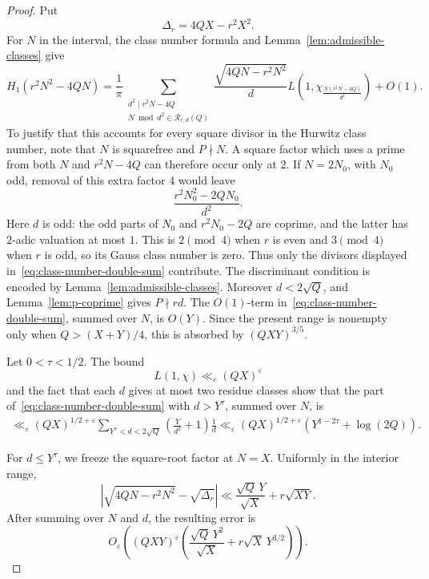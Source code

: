 \documentclass[10pt,a4paper]{amsart}
\begin{document}
\begin{proof}
Put
\[
\Delta_r=4QX-r^2X^2.
\]
For $N$ in the interval, the class number formula and
Lemma~\ref{lem:admissible-classes} give
\begin{equation}\label{eq:class-number-double-sum}
H_1(r^2N^2-4QN)
=
\frac1\pi
\sum_{\substack{d^2\mid r^2N-4Q\\
N\bmod d^2\in\mathcal R_{r,d}(Q)}}
\frac{\sqrt{4QN-r^2N^2}}{d}
L\left(1,\chi_{\frac{N(r^2N-4Q)}{d^2}}\right)
+
O(1).
\end{equation}
To justify that this accounts for every square divisor in the Hurwitz class number, note that $N$ is squarefree and $P\nmid N$.
A square factor which uses a prime from both $N$ and $r^2N-4Q$ can therefore occur only at $2$.
If $N=2N_0$, with $N_0$ odd, removal of this extra factor $4$ would leave
\[
\frac{r^2N_0^2-2QN_0}{d^2}.
\]
Here $d$ is odd: the odd parts of $N_0$ and
$r^2N_0-2Q$ are coprime, and the latter has $2$-adic valuation at most $1$.
This is $2\pmod4$ when $r$ is even and $3\pmod4$ when $r$ is odd, so its Gauss class number is zero.
Thus only the divisors displayed in~\eqref{eq:class-number-double-sum} contribute.
The discriminant condition is encoded by Lemma~\ref{lem:admissible-classes}.
Moreover $d<2\sqrt Q$, and Lemma~\ref{lem:p-coprime} gives $P\nmid rd$.
The $O(1)$-term in~\eqref{eq:class-number-double-sum}, summed over $N$, is $O(Y)$.
Since the present range is nonempty only when $Q>(X+Y)/4$, this is absorbed by $(QXY)^{3/5}$.

Let $0<\tau<1/2$.
The bound
\[
L(1,\chi)\ll_\varepsilon(QX)^\varepsilon
\]
and the fact that each $d$ gives at most two residue classes show that the part of~\eqref{eq:class-number-double-sum} with $d>Y^\tau$, summed over $N$, is
\begin{align}
\ll_\varepsilon
(QX)^{1/2+\varepsilon}
\sum_{Y^\tau<d<2\sqrt Q}
\left(\frac{Y}{d^2}+1\right)\frac1d
\ll_\varepsilon
(QX)^{1/2+\varepsilon}
\left(Y^{1-2\tau}+\log(2Q)\right).
\label{eq:large-d}
\end{align}

For $d\leq Y^\tau$, we freeze the square-root factor at $N=X$.
Uniformly in the interior range,
\[
\left|
\sqrt{4QN-r^2N^2}-\sqrt{\Delta_r}
\right|
\ll
\frac{\sqrt Q\,Y}{\sqrt X}
+r\sqrt{XY}.
\]
After summing over $N$ and $d$, the resulting error is
\begin{equation}\label{eq:square-root-variation}
O_\varepsilon\left(
(QXY)^\varepsilon
\left(
\frac{\sqrt Q\,Y^2}{\sqrt X}
+r\sqrt X\,Y^{3/2}
\right)
\right).
\end{equation}


\end{proof}
\end{document}
